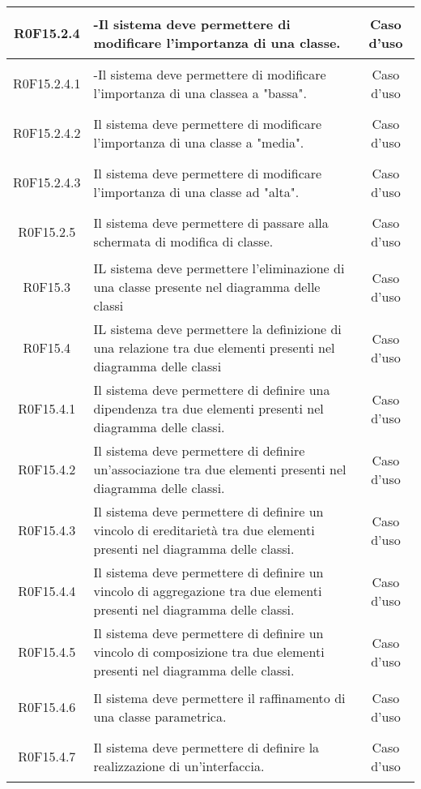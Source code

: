 \documentclass[../AnalisiDeiRequisiti.tex]{subfiles}
\begin{document}
\begin{longtable}{|c|>{\centering}p{7cm}|c|}
\hypertarget{R0F15.2.4}{R0F15.2.4} & -Il sistema deve permettere di modificare l'importanza di una classe. & Caso d'uso \\ \hline
\hypertarget{R0F15.2.4.1}{R0F15.2.4.1} & -Il sistema deve permettere di modificare l'importanza di una classea a "bassa". & Caso d'uso \\ \hline
\hypertarget{R0F15.2.4.2}{R0F15.2.4.2} & Il sistema deve permettere di modificare l'importanza di una classe a "media". & Caso d'uso \\ \hline
\hypertarget{R0F15.2.4.3}{R0F15.2.4.3} & Il sistema deve permettere di modificare l'importanza di una classe ad "alta". & Caso d'uso \\ \hline
\hypertarget{R0F15.2.5}{R0F15.2.5} & Il sistema deve permettere di passare alla schermata di modifica di classe. & Caso d'uso \\ \hline
\hypertarget{R0F15.3}{R0F15.3} & IL sistema deve permettere l'eliminazione di una classe presente nel diagramma delle classi & Caso d'uso \\ \hline
\hypertarget{R0F15.4}{R0F15.4} & IL sistema deve permettere la definizione di una relazione tra due elementi presenti nel diagramma delle classi & Caso d'uso \\ \hline
\hypertarget{R0F15.4.1}{R0F15.4.1} & Il sistema deve permettere di definire una dipendenza tra due elementi presenti nel diagramma delle classi. & Caso d'uso \\ \hline
\hypertarget{R0F15.4.2}{R0F15.4.2} & Il sistema deve permettere di definire un'associazione tra due elementi presenti nel diagramma delle classi. & Caso d'uso \\ \hline
\hypertarget{R0F15.4.3}{R0F15.4.3} & Il sistema deve permettere di definire un vincolo di ereditarietà tra due elementi presenti nel diagramma delle classi. & Caso d'uso \\ \hline
\hypertarget{R0F15.4.4}{R0F15.4.4} & Il sistema deve permettere di definire un vincolo di aggregazione tra due elementi presenti nel diagramma delle classi. & Caso d'uso \\ \hline
\hypertarget{R0F15.4.5}{R0F15.4.5} & Il sistema deve permettere di definire un vincolo di composizione tra due elementi presenti nel diagramma delle classi. & Caso d'uso \\ \hline
\hypertarget{R0F15.4.6}{R0F15.4.6} & Il sistema deve permettere il raffinamento di una classe parametrica. & Caso d'uso \\ \hline
\hypertarget{R0F15.4.7}{R0F15.4.7} & Il sistema deve permettere di definire la realizzazione di un'interfaccia. & Caso d'uso \\ \hline

\end{longtable}
\end{document}
